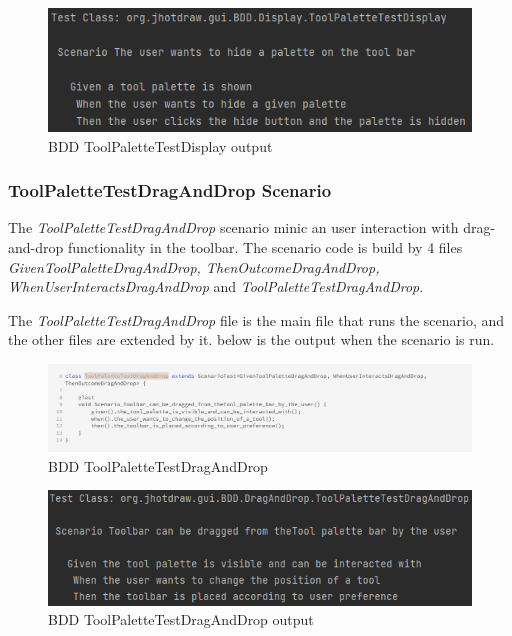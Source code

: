 \begin{figure}[H]
    \centering
    \includegraphics[width=\linewidth]{pic/BDD ToolPaletteTestDisplay output.png}
    \caption{BDD ToolPaletteTestDisplay output}
    \label{fig:BDD ToolPaletteTestDisplay output}
\end{figure}



\subsubsection{ToolPaletteTestDragAndDrop Scenario}
The \textit{ToolPaletteTestDragAndDrop} scenario minic an user interaction with drag-and-drop functionality in the toolbar.
The scenario code is build by 4 files \textit{GivenToolPaletteDragAndDrop, ThenOutcomeDragAndDrop, WhenUserInteractsDragAndDrop} and \textit{ToolPaletteTestDragAndDrop}.

The \textit{ToolPaletteTestDragAndDrop} file is the main file that runs the scenario, and the other files are extended by it. below is the output when the scenario is run.

\begin{figure}[H]
    \centering
    \includegraphics[width=\linewidth]{pic/BDD ToolPaletteTestDragAndDrop.png}
    \caption{BDD ToolPaletteTestDragAndDrop}
    \label{fig:BDD ToolPaletteTestDragAndDrop}
\end{figure}



\begin{figure}[H]
    \centering
    \includegraphics[width=\linewidth]{pic/BDD ToolPaletteTestDragAndDrop output.png}
    \caption{BDD ToolPaletteTestDragAndDrop output}
    \label{fig:BDD ToolPaletteTestDragAndDrop output}
\end{figure}